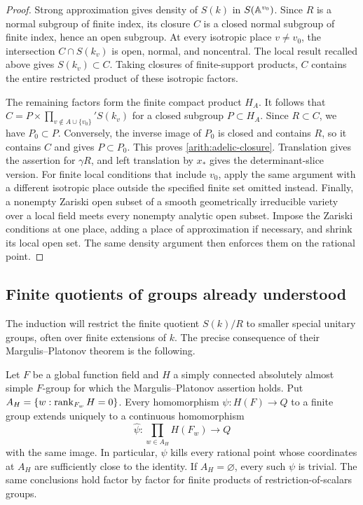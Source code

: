 \begin{proof}
Strong approximation gives density of $S(k)$ in $S(\mathbb A^{v_0})$.  Since
$R$ is a normal subgroup of finite index, its closure $C$ is a closed
normal subgroup of finite index, hence an open subgroup.  At every
isotropic place $v\ne v_0$, the intersection $C\cap S(k_v)$ is open,
normal, and noncentral.  The local result recalled above gives
$S(k_v)\subset C$.  Taking closures of finite-support products, $C$
contains the entire restricted product of these isotropic factors.

The remaining factors form the finite compact product $H_A$.
It follows that $C=P\times\prod_{v\notin A\cup\{v_0\}}'S(k_v)$ for a
closed subgroup $P\subset H_A$.  Since $R\subset C$, we have
$P_0\subset P$.  Conversely, the inverse image of $P_0$ is closed and
contains $R$, so it contains $C$ and gives $P\subset P_0$.  This proves
\eqref{arith:adelic-closure}.  Translation gives the assertion for
$\gamma R$, and left translation by $x_*$ gives the determinant-slice
version.  For finite local conditions that include $v_0$, apply the same
argument with a different isotropic place outside the specified finite
set omitted instead.  Finally, a nonempty Zariski open subset of a
smooth geometrically irreducible variety over a local field meets every
nonempty analytic open subset.  Impose the Zariski conditions at one
place, adding a place of approximation if necessary, and shrink its
local open set.  The same density argument then enforces them on the
rational point.
\end{proof}

\subsection{Finite quotients of groups already understood}

The induction will restrict the finite quotient $S(k)/R$ to smaller
special unitary groups, often over finite extensions of $k$.  The precise
consequence of their Margulis--Platonov theorem is the following.

\begin{proposition}\label{arith:finite-quotients}
Let $F$ be a global function field and $H$ a simply connected absolutely
almost simple $F$-group for which the Margulis--Platonov assertion holds.
Put $A_H=\{w:\operatorname{rank}_{F_w}H=0\}$.  Every homomorphism
$\psi:H(F)\to Q$ to a finite group extends uniquely to a continuous
homomorphism
\[
 \widehat\psi:\prod_{w\in A_H}H(F_w)\longrightarrow Q
\]
with the same image.  In particular, $\psi$ kills every rational point
whose coordinates at $A_H$ are sufficiently close to the identity.
If $A_H=\varnothing$, every such $\psi$ is trivial.
The same conclusions hold factor by factor for finite products of
restriction-of-scalars groups.
\end{proposition}


